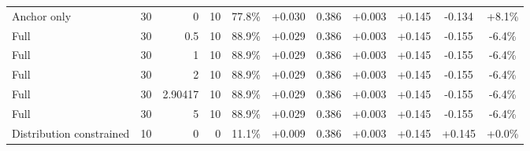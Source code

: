 \begin{table}[htbp]
\begin{tabular}{lrrrccccccc}
Anchor only & 30 & 0 & 10 & 77.8\% & +0.030 & 0.386 & +0.003 & +0.145 & -0.134 & +8.1\% \\
Full & 30 & 0.5 & 10 & 88.9\% & +0.029 & 0.386 & +0.003 & +0.145 & -0.155 & -6.4\% \\
Full & 30 & 1 & 10 & 88.9\% & +0.029 & 0.386 & +0.003 & +0.145 & -0.155 & -6.4\% \\
Full & 30 & 2 & 10 & 88.9\% & +0.029 & 0.386 & +0.003 & +0.145 & -0.155 & -6.4\% \\
Full & 30 & 2.90417 & 10 & 88.9\% & +0.029 & 0.386 & +0.003 & +0.145 & -0.155 & -6.4\% \\
Full & 30 & 5 & 10 & 88.9\% & +0.029 & 0.386 & +0.003 & +0.145 & -0.155 & -6.4\% \\
Distribution constrained & 10 & 0 & 0 & 11.1\% & +0.009 & 0.386 & +0.003 & +0.145 & +0.145 & +0.0\% \\
\bottomrule
\end{tabular}
\end{table}